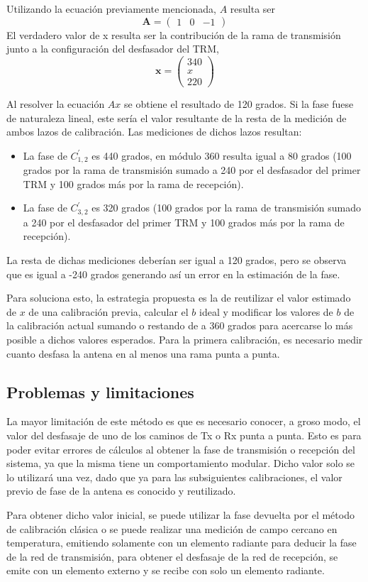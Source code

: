 Utilizando la ecuación previamente mencionada, $A$ resulta ser
$$
	\mathbf{A} = \begin{pmatrix} 1 & 0 & -1\end{pmatrix}
$$
El verdadero valor de x resulta ser la contribución de la rama de transmisión junto a la configuración del desfasador del TRM,
$$
	\mathbf{x} = \begin{pmatrix} 340 \\ x \\ 220\end{pmatrix}
$$

Al resolver la ecuación $Ax$ se obtiene el resultado de 120 grados. Si la fase fuese de naturaleza lineal, este sería el valor 
resultante de la resta de la medición de ambos lazos de calibración. Las mediciones de dichos lazos resultan: 
\begin{itemize}
	\item La fase de $C^{'}_{1,2}$ es 440 grados, en módulo 360 resulta igual a 80 grados (100 grados por la rama de
		transmisión sumado a 240 por el desfasador del primer TRM y 100 grados más por la rama de recepción).
	\item La fase de $C^{'}_{3, 2}$ es 320 grados (100 grados por la rama de transmisión sumado a 240 por el desfasador
		del primer TRM y 100 grados más por la rama de recepción).
\end{itemize}

La resta de dichas mediciones deberían ser igual a 120 grados, pero se observa que es igual a -240 grados generando así un
error en la estimación de la fase.

Para soluciona esto, la estrategia propuesta es la de reutilizar el valor estimado de $x$ de una calibración previa, calcular
el $b$ ideal y modificar los valores de $b$ de la calibración actual sumando o restando de a 360 grados para acercarse lo más 
posible a dichos valores esperados. Para la primera calibración, es necesario medir cuanto desfasa la antena en al menos una 
rama punta a punta. 

\subsection{Problemas y limitaciones}

La mayor limitación de este método es que es necesario conocer, a groso modo, el valor del desfasaje de uno de los caminos de
Tx o Rx punta a punta. Esto es para poder evitar errores de cálculos al obtener la fase de transmisión o recepción del
sistema, ya que la misma tiene un comportamiento modular. Dicho valor solo se lo utilizará una vez, dado que ya para las
subsiguientes calibraciones, el valor previo de fase de la antena es conocido y reutilizado. 

Para obtener dicho valor inicial, se puede utilizar la fase devuelta por el método de calibración clásica o se puede realizar
una medición de campo cercano en temperatura, emitiendo solamente con un elemento radiante para deducir la fase de la red de 
transmisión, para obtener el desfasaje de la red de recepción, se emite con un elemento externo y se recibe con solo un elemento
radiante. 
